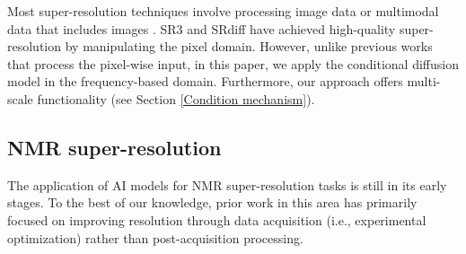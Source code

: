 

Most super-resolution techniques involve processing image data or multimodal data that includes images \cite{luo2023image,chen2024hierarchical}. SR3 \cite{sr3} and SRdiff \cite{srdiff} have achieved high-quality super-resolution by manipulating the pixel domain. 
However, unlike previous works that process the pixel-wise input, in this paper, we apply the conditional diffusion model in the frequency-based domain. Furthermore, our approach offers multi-scale functionality (see Section \ref{Condition mechanism}).

\subsection{NMR super-resolution}\label{nmr super-reso}

The application of AI models for NMR super-resolution tasks is still in its early stages. To the best of our knowledge, prior work in this area has primarily focused on improving resolution through data acquisition (i.e., experimental optimization) rather than post-acquisition processing.

